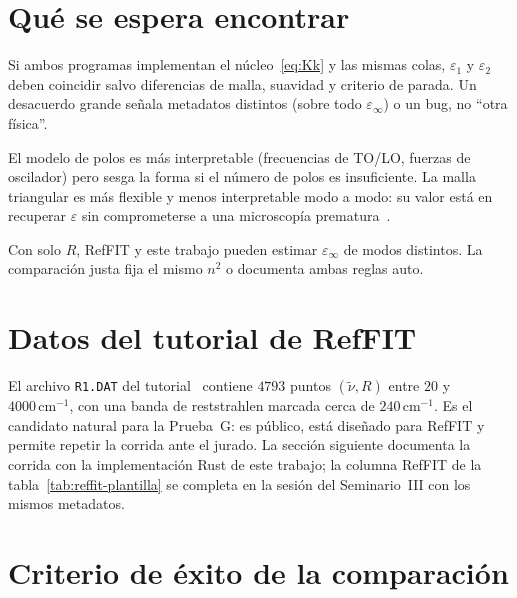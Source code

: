 \section{Qu\'e se espera encontrar}

\begin{description}[style=nextline,leftmargin=1.1cm]
\item[Acuerdo triangular--triangular.]
Si ambos programas implementan el n\'ucleo~\eqref{eq:Kk} y las mismas colas, $\varepsilon_1$ y $\varepsilon_2$ deben coincidir salvo diferencias de malla, suavidad y criterio de parada. Un desacuerdo grande se\~nala metadatos distintos (sobre todo $\varepsilon_\infty$) o un bug, no ``otra f\'isica''.
\item[Tri\'angulos frente a osciladores.]
El modelo de polos es m\'as interpretable (frecuencias de TO/LO, fuerzas de oscilador) pero sesga la forma si el n\'umero de polos es insuficiente. La malla triangular es m\'as flexible y menos interpretable modo a modo: su valor est\'a en recuperar $\hat\varepsilon$ sin comprometerse a una microscop\'ia prematura~\cite{constrained}.
\item[Rol de $\varepsilon_\infty$.]
Con solo $R$, RefFIT y este trabajo pueden estimar $\varepsilon_\infty$ de modos distintos. La comparaci\'on justa fija el mismo $n^{2}$ o documenta ambas reglas auto.
\end{description}

\section{Datos del tutorial de RefFIT}

El archivo \texttt{R1.DAT} del tutorial~\cite{guide} contiene $4793$ puntos $(\tilde\nu,R)$ entre $20$ y $4000\,\mathrm{cm}^{-1}$, con una banda de reststrahlen marcada cerca de $240\,\mathrm{cm}^{-1}$.
Es el candidato natural para la Prueba~G: es p\'ublico, est\'a dise\~nado para RefFIT y permite repetir la corrida ante el jurado.
La secci\'on siguiente documenta la corrida con la implementaci\'on Rust de este trabajo; la columna RefFIT de la tabla~\ref{tab:reffit-plantilla} se completa en la sesi\'on del Seminario~III con los mismos metadatos.

\section{Criterio de \'exito de la comparaci\'on}

